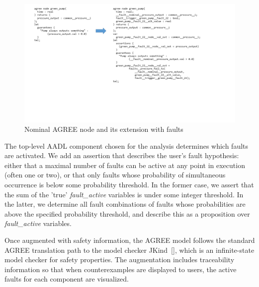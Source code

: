 \begin{figure}
\vspace{-0.1in}
\includegraphics[trim=30 150 120 10,clip,width=\textwidth]{images/sample_code.png}
\vspace{-0.3in}
\caption{Nominal AGREE node and its extension with faults}
\label{fig:comp}
\end{figure}

The top-level AADL component chosen for the analysis determines which faults are activated.  We add an assertion that describes the user's fault hypothesis: either that a maximal number of faults can be active at any point in execution (often one or two), or that only faults whose probability of simultaneous occurrence is below some probability threshold.  In the former case, we assert that the sum of the 'true' {\em fault\_active} variables is under some integer threshold.  In the latter, we determine all fault combinations of faults whose probabilities are above the specified probability threshold, and describe this as a proposition over {\em fault\_active} variables.
 
Once augmented with safety information, the AGREE model follows the standard AGREE translation path to the model checker JKind~\ref{}, which is an infinite-state model checker for safety properties.  The augmentation includes traceability information so that when counterexamples are displayed to users, the active faults for each component are visualized. 
 


